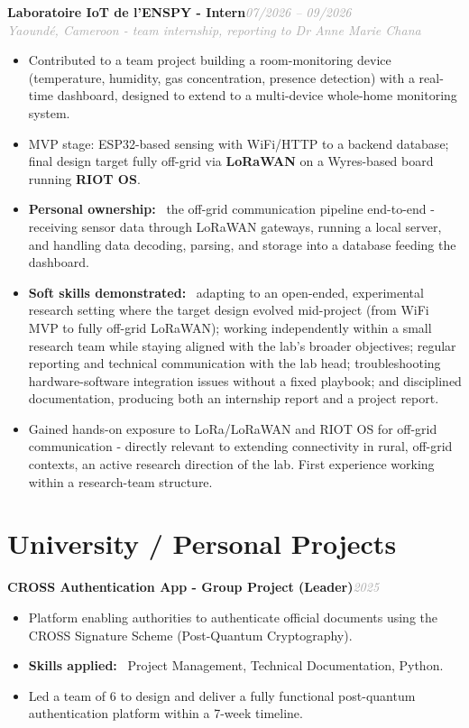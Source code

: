 \documentclass[10pt, a4paper]{article}
\newcommand{\entryhead}[2]{%
  \noindent\textbf{#1}\hfill{\small\textit{\textcolor{darkgray}{#2}}}\\[-4pt]%
}
\newcommand{\entrysub}[1]{%
  {\small\textit{\textcolor{darkgray}{#1}}}\\[2pt]%
}
\newcommand{\blabel}[1]{\textbf{#1}\ }
\begin{document}
\entryhead{Laboratoire IoT de l'ENSPY \normalfont\small- Intern}{07/2026 -- 09/2026}
\entrysub{Yaoundé, Cameroon - team internship, reporting to Dr Anne Marie Chana}
\begin{itemize}
  \item Contributed to a team project building a room-monitoring device (temperature, humidity,
        gas concentration, presence detection) with a real-time dashboard, designed to extend to
        a multi-device whole-home monitoring system.
  \item MVP stage: ESP32-based sensing with WiFi/HTTP to a backend database; final design target
        fully off-grid via \textbf{LoRaWAN} on a Wyres-based board running \textbf{RIOT OS}.
  \item \blabel{Personal ownership:} the off-grid communication pipeline end-to-end - receiving
        sensor data through LoRaWAN gateways, running a local server, and handling data decoding,
        parsing, and storage into a database feeding the dashboard.
  \item \blabel{Soft skills demonstrated:} adapting to an open-ended, experimental research
        setting where the target design evolved mid-project (from WiFi MVP to fully off-grid
        LoRaWAN); working independently within a small research team while staying aligned with
        the lab's broader objectives; regular reporting and technical communication with the lab
        head; troubleshooting hardware-software integration issues without a fixed playbook;
        and disciplined documentation, producing both an internship report and a project report.
  \item Gained hands-on exposure to LoRa/LoRaWAN and RIOT OS for off-grid communication -
        directly relevant to extending connectivity in rural, off-grid contexts, an active
        research direction of the lab. First experience working within a research-team structure.
\end{itemize}

\section{University / Personal Projects}

\entryhead{CROSS Authentication App \normalfont\small- Group Project (Leader)}{2025}
\begin{itemize}
  \item Platform enabling authorities to authenticate official documents using the CROSS Signature
        Scheme (Post-Quantum Cryptography).
  \item \blabel{Skills applied:} Project Management, Technical Documentation, Python.
  \item Led a team of 6 to design and deliver a fully functional post-quantum authentication
        platform within a 7-week timeline.
\end{itemize}
\end{document}
